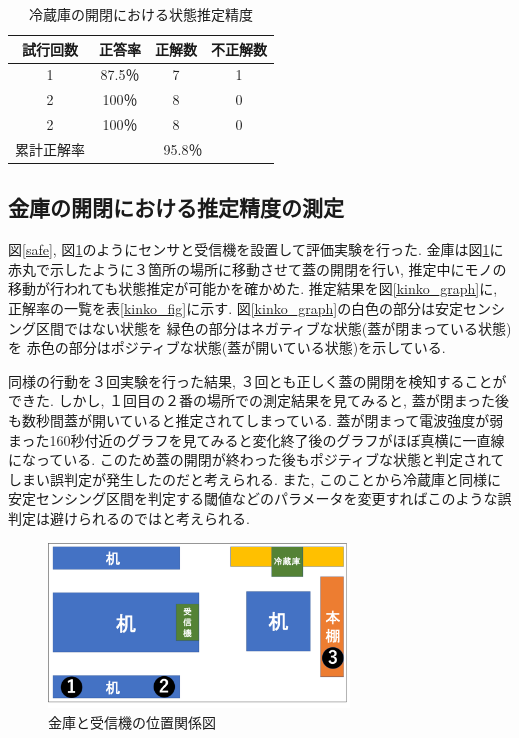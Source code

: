 \documentclass[Japanese]{dicomopapers}
\begin{document}
\begin{table}[htb]
    \begin{center}
        \caption{冷蔵庫の開閉における状態推定精度}
        \label{refrigerator_fig}
        \begin{tabular}{|c|c|c|c|} \hline
        試行回数 & 正答率 & 正解数 & 不正解数 \\ \hline
        1 & 87.5％ & 7 & 1 \\ \hline
        2 & 100％ & 8 & 0 \\ \hline
        2 & 100％ & 8 & 0 \\ \hline \hline
        累計正解率 & \multicolumn{3}{c|}{95.8％} \\ \hline
        \end{tabular}
    \end{center}
\end{table}



\subsection{金庫の開閉における推定精度の測定}
図\ref{safe}, 図\ref{kinko_position}のようにセンサと受信機を設置して評価実験を行った.
金庫は図\ref{kinko_position}に赤丸で示したように３箇所の場所に移動させて蓋の開閉を行い, 推定中にモノの移動が行われても状態推定が可能かを確かめた.
推定結果を図\ref{kinko_graph}に, 正解率の一覧を表\ref{kinko_fig}に示す.
図\ref{kinko_graph}の白色の部分は安定センシング区間ではない状態を 緑色の部分はネガティブな状態(蓋が閉まっている状態)を 赤色の部分はポジティブな状態(蓋が開いている状態)を示している.

同様の行動を３回実験を行った結果, ３回とも正しく蓋の開閉を検知することができた.
しかし, １回目の２番の場所での測定結果を見てみると, 蓋が閉まった後も数秒間蓋が開いていると推定されてしまっている.
蓋が閉まって電波強度が弱まった160秒付近のグラフを見てみると変化終了後のグラフがほぼ真横に一直線になっている.
このため蓋の開閉が終わった後もポジティブな状態と判定されてしまい誤判定が発生したのだと考えられる.
また, このことから冷蔵庫と同様に安定センシング区間を判定する閾値などのパラメータを変更すればこのような誤判定は避けられるのではと考えられる.

\begin{figure}[ht]
    \centering
    \includegraphics[width=8cm]{kinko_position_fig.png}
    \caption{金庫と受信機の位置関係図}
    \label{kinko_position}
\end{figure}
\end{document}
